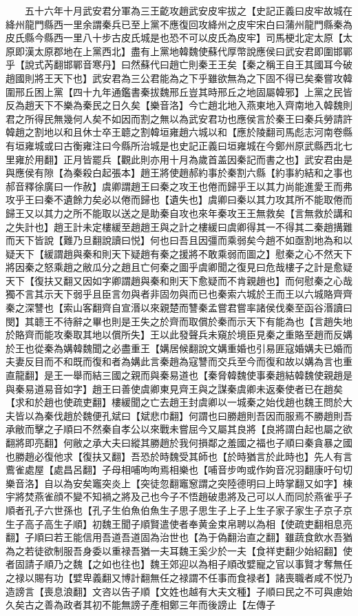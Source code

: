 　　五十六年十月武安君分軍為三王齕攻趙武安皮牢拔之【史記正義曰皮牢故城在絳州龍門縣西一里余謂秦兵已至上黨不應復回攻絳州之皮牢宋白曰蒲州龍門縣秦為皮氏縣今縣西一里八十步古皮氏城是也恐不可以皮氏為皮牢】司馬梗北定太原【太原即漢太原郡地在上黨西北】盡有上黨地韓魏使蘇代厚幣說應侯曰武安君即圍邯鄲乎【說式芮翻邯鄲音寒丹】曰然蘇代曰趙亡則秦王王矣【秦之稱王自王其國耳今破趙國則將王天下也】武安君為三公君能為之下乎雖欲無為之下固不得已矣秦嘗攻韓圍邢丘困上黨【四十九年通鑑書秦拔魏邢丘豈其時邢丘之地固屬韓邪】上黨之民皆反為趙天下不樂為秦民之日久矣【樂音洛】今亡趙北地入燕東地入齊南地入韓魏則君之所得民無幾何人矣不如因而割之無以為武安君功也應侯言於秦王曰秦兵勞請許韓趙之割地以和且休士卒王聼之割韓垣雍趙六城以和【應於陵翻司馬彪志河南卷縣有垣雍城或曰古衡雍注曰今縣所治城是也史記正義曰垣雍城在今鄭州原武縣西北七里雍於用翻】正月皆罷兵【觀此則亦用十月為歲首盖因秦記而書之也】武安君由是與應侯有隙【為秦殺白起張本】趙王將使趙郝約事於秦割六縣【約事約結和之事也郝音釋徐廣曰一作赦】虞卿謂趙王曰秦之攻王也倦而歸乎王以其力尚能進愛王而弗攻乎王曰秦不遺餘力矣必以倦而歸也【遺失也】虞卿曰秦以其力攻其所不能取倦而歸王又以其力之所不能取以送之是助秦自攻也來年秦攻王王無救矣【言無救於講和之失計也】趙王計未定樓緩至趙趙王與之計之樓緩曰虞卿得其一不得其二秦趙搆難而天下皆說【難乃旦翻說讀曰悦】何也曰吾且因彊而乘弱矣今趙不如亟割地為和以疑天下【緩謂趙與秦和則天下疑趙有秦之援將不敢乘弱而圖之】慰秦之心不然天下將因秦之怒乘趙之敝瓜分之趙且亡何秦之圖乎虞卿聞之復見曰危哉樓子之計是愈疑天下【復扶又翻又因如字卿謂趙與秦和則天下愈疑而不肯親趙也】而何慰秦之心哉獨不言其示天下弱乎且臣言勿與者非固勿與而已也秦索六城於王而王以六城賂齊齊秦之深讐也【索山客翻齊自宣湣以來親楚而讐秦孟嘗君嘗率諸侯伐秦至函谷湣讀曰閔】其聼王不待辭之畢也則是王失之於齊而取償於秦而示天下有能為也【言趙失地於賂齊而能攻秦取其地以償所失】王以此發聲兵未窺於境臣見秦之重賂至趙而反媾於王也從秦為媾韓魏聞之必盡重王【媾居候翻說文媾重婚也引易匪寇婚媾夫已婚而夫妻反目而不和既而復和者為媾此言秦趙為寇讐而交兵至今而復和故以媾為言也重直龍翻】是王一舉而結三國之親而與秦易道也【秦脅韓魏使事秦趙結韓魏使親趙是與秦易道易音如字】趙王曰善使虞卿東見齊王與之謀秦虞卿未返秦使者已在趙矣【求和於趙也使疏吏翻】樓緩聞之亡去趙王封虞卿以一城秦之始伐趙也魏王問於大夫皆以為秦伐趙於魏便孔斌曰【斌悲巾翻】何謂也曰勝趙則吾因而服焉不勝趙則吾承敝而擊之子順曰不然秦自孝公以來戰未嘗屈今又屬其良將【良將謂白起也屬之欲翻將即亮翻】何敝之承大夫曰縱其勝趙於我何損鄰之羞國之福也子順曰秦貪暴之國也勝趙必復他求【復扶又翻】吾恐於時魏受其師也【於時猶言於此時也】先人有言鷰雀處屋【處昌呂翻】子母相哺呴呴焉相樂也【哺音步呴或作姁音况羽翻康吁句切樂音洛】自以為安矣竈突炎上【突徒忽翻竈䆫謂之突陸德明曰上時掌翻又如字】棟宇將焚燕雀顔不變不知禍之將及己也今子不悟趙破患將及己可以人而同於燕雀乎子順者孔子六世孫也【孔子生伯魚伯魚生子思子思生子上子上生子家子家生子京子京生子高子高生子順】初魏王聞子順賢遣使者奉黄金束帛聘以為相【使疏吏翻相息亮翻】子順曰若王能信用吾道吾道固為治世也【為于偽翻治直之翻】雖蔬食飲水吾猶為之若徒欲制服吾身委以重禄吾猶一夫耳魏王奚少於一夫【食祥吏翻少始紹翻】使者固請子順乃之魏【之如也往也】魏王郊迎以為相子順改嬖寵之官以事賢才奪無任之禄以賜有功【嬖卑義翻又博計翻無任之禄謂不任事而食禄者】諸喪職者咸不悦乃造謗言【喪息浪翻】文咨以告子順【文姓也越有大夫文種】子順曰民之不可與慮始久矣古之善為政者其初不能無謗子產相鄭三年而後謗止【左傳子